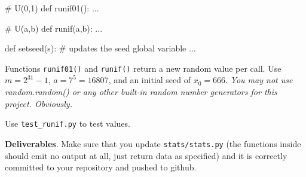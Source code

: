 \begin{fullwidth}
\begin{pyverbatim}
# U(0,1)
def runif01():
    ...

# U(a,b)
def runif(a,b):
    ...

def setseed(s): # updates the seed global variable
    ...
\end{pyverbatim}

Functions {\tt runif01()} and {\tt runif()} return a new random value per call. Use $m = 2^{31} - 1$, $a = 7^5 = 16807$, and an initial seed of $x_0 = 666$.  {\em You may not use random.random() or any other built-in random number generators for this project.  Obviously.}

Use {\tt test\_runif.py} to test values.

\begin{callout}{\bcplume}
{\bf Deliverables}. Make sure that you update {\tt stats/stats.py} (the functions inside should emit no output at all, just return data as specified) and it is correctly committed to your repository and pushed to github. 
\end{callout}

\end{fullwidth}
